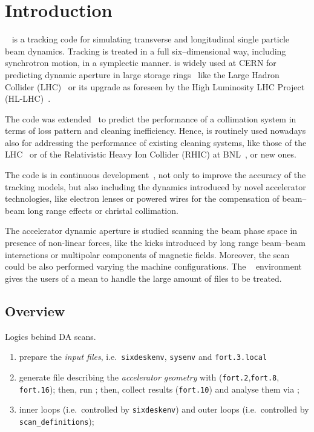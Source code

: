 \chapter{Introduction} \label{Intro}
\SIXTRACK{}~\cite{SixTrack_user_manual,SixPub,sixtrackWeb} is a tracking
code for simulating transverse and longitudinal single particle beam dynamics.
Tracking is treated in a full six--dimensional way, including synchrotron
motion, in a symplectic manner. \SIXTRACK{} is widely used at CERN for
predicting dynamic aperture in large storage
rings~\cite{DynApeStudiesGiovannozzi2015} like the Large Hadron Collider
(LHC)~\cite{NomLHCdesignRepoV1} or its upgrade as foreseen by the
High Luminosity LHC Project (HL-LHC)~\cite{HLLHC_book,HLLHCtechDesRepo}.

The code was extended~\cite{SixTrackForCollimation} to predict the
performance of a collimation system in terms of loss pattern and cleaning
inefficiency. Hence, \SIXTRACK{} is routinely used nowadays also
for addressing the performance of existing cleaning systems,
like those of the LHC~\cite{LHCCollSys} or of the Relativistic
Heavy Ion Collider (RHIC) at BNL~\cite{RHICcollSys}, or new ones.

The code is in continuous development~\cite{HLLHCTrackWS,Amereghe6TColl},
not only to improve the accuracy of the tracking models, but also including
the dynamics introduced by novel accelerator technologies, like electron
lenses or powered wires for the compensation of beam--beam long range effects
or christal collimation.

The accelerator dynamic aperture is studied scanning
the beam phase space in presence of non-linear forces, like the kicks
introduced by long range beam--beam interactions or multipolar components
of magnetic fields. Moreover, the scan could be also performed varying
the machine configurations. The
\SIXDESK{}~\cite{SixDesk_original,SixDesk_updated} environment gives the
users of \SIXTRACK{} a mean to handle the large amount of files to be treated.

\section{Overview} \label{Overview}
Logics behind DA scans.
\begin{enumerate}
\item prepare the \emph{input files}, i.e.~\texttt{sixdeskenv},
\texttt{sysenv} and \texttt{fort.3.local}
\item \SIXTRACK{} generate file describing the \emph{accelerator geometry}
  with \MADX{} (\texttt{fort.2},\texttt{fort.8},
  \texttt{fort.16}); then, run \SIXTRACK{}; then, collect results
  (\texttt{fort.10}) and analyse them via \SIXDB{};
\item inner loops (i.e.~controlled by \texttt{sixdeskenv}) and outer loops
  (i.e.~controlled by \texttt{scan\_definitions});
\end{enumerate}

